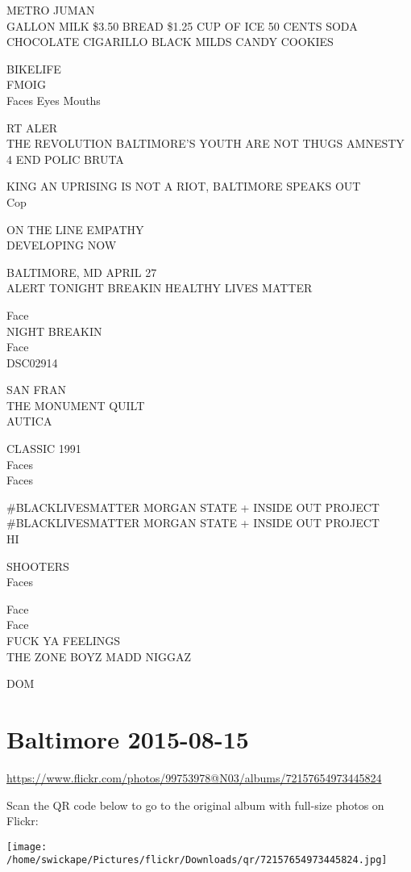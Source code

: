 \documentclass[10pt,letterpaper]{article}
\begin{document}
METRO JUMAN\\
GALLON MILK \$3.50 BREAD \$1.25 CUP OF ICE 50 CENTS SODA CHOCOLATE CIGARILLO BLACK MILDS CANDY COOKIES

BIKELIFE\\
FMOIG\\
Faces Eyes Mouths

RT ALER\\
THE REVOLUTION BALTIMORE'S YOUTH ARE NOT THUGS AMNESTY 4 END POLIC BRUTA

KING AN UPRISING IS NOT A RIOT, BALTIMORE SPEAKS OUT\\
Cop

ON THE LINE EMPATHY\\
DEVELOPING NOW

BALTIMORE, MD APRIL 27\\
ALERT TONIGHT BREAKIN HEALTHY LIVES MATTER

Face\\
NIGHT BREAKIN\\
Face\\
DSC02914

SAN FRAN\\
THE MONUMENT QUILT\\
AUTICA

CLASSIC 1991\\
Faces\\
Faces

\#BLACKLIVESMATTER MORGAN STATE + INSIDE OUT PROJECT\\
\#BLACKLIVESMATTER MORGAN STATE + INSIDE OUT PROJECT\\
HI

SHOOTERS\\
Faces

Face\\
Face\\
FUCK YA FEELINGS\\
THE ZONE BOYZ MADD NIGGAZ

DOM


\section*{Baltimore 2015-08-15}

\url{https://www.flickr.com/photos/99753978@N03/albums/72157654973445824}

Scan the QR code below to go to the original album with full-size photos on Flickr:

\texttt{[image: /home/swickape/Pictures/flickr/Downloads/qr/72157654973445824.jpg]}
\end{document}
